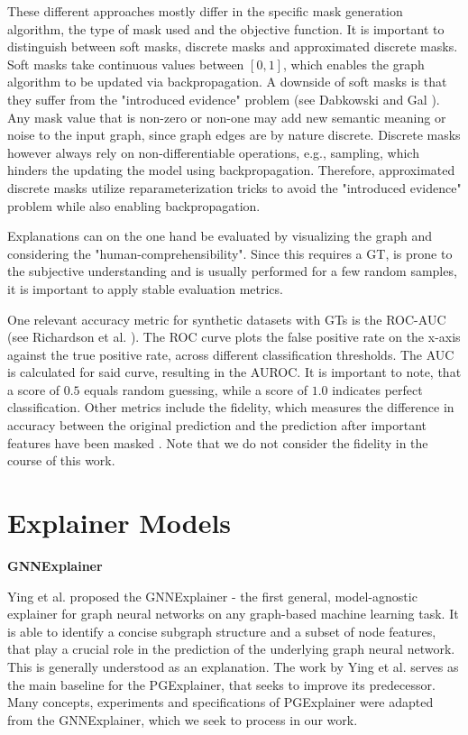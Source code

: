 These different approaches mostly differ in the specific mask generation algorithm, the type of mask used and the objective function. It is important to distinguish between soft masks, discrete masks and approximated discrete masks. Soft masks take continuous values between $[0,1]$, which enables the graph algorithm to be updated via backpropagation. A downside of soft masks is that they suffer from the "introduced evidence" problem (see Dabkowski and Gal \cite{dabkowski2017real}). Any mask value that is non-zero or non-one may add new semantic meaning or noise to the input graph, since graph edges are by nature discrete. Discrete masks however always rely on non-differentiable operations, e.g., sampling, which hinders the updating the model using backpropagation. Therefore, approximated discrete masks utilize reparameterization tricks to avoid the "introduced evidence" problem while also enabling backpropagation. \bigskip %

Explanations can on the one hand be evaluated by visualizing the graph and considering the "human-comprehensibility". Since this requires a \ac{GT}, is prone to the subjective understanding and is usually performed for a few random samples, it is important to apply stable evaluation metrics.

One relevant accuracy metric for synthetic datasets with \acp{GT} is the \ac{ROC-AUC} (see Richardson et al. \cite{RICHARDSON2024100994}). The \ac{ROC} curve plots the false positive rate on the x-axis against the true positive rate, across different classification thresholds. The \ac{AUC} is calculated for said curve, resulting in the AUROC. It is important to note, that a score of $0.5$ equals random guessing, while a score of $1.0$ indicates perfect classification. Other metrics include the fidelity, which measures the difference in accuracy between the original prediction and the prediction after important features have been masked \cite{yuan2022explainability}. Note that we do not consider the fidelity in the course of this work.


\section{Explainer Models}
\label{sec:Explainer_Models}

\textbf{GNNExplainer} \par
Ying et al. proposed the GNNExplainer \cite{ying2019gnnexplainer} - the first general, model-agnostic explainer for graph neural networks on any graph-based machine learning task. It is able to identify a concise subgraph structure and a subset of node features, that play a crucial role in the prediction of the underlying graph neural network. This is generally understood as an explanation. The work by Ying et al. serves as the main baseline for the PGExplainer, that seeks to improve its predecessor. Many concepts, experiments and specifications of PGExplainer were adapted from the GNNExplainer, which we seek to process in our work. \bigskip


